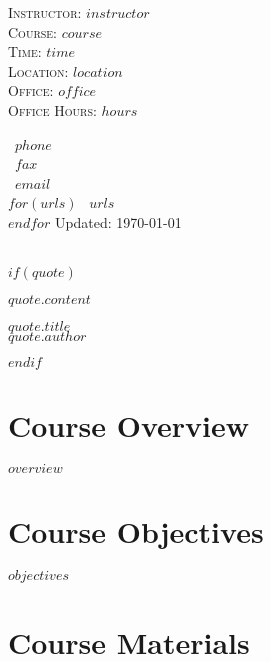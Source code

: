 \documentclass[$fontsize$, letterpaper]{article}
\begin{document}

\begin{minipage}[t]{2.95in}
 \flushleft \footnotesize \textsc{Instructor:} $instructor$\\ \textsc{Course:}
 $course$\\ \textsc{Time:} $time$\\ \textsc{Location:} $location$\\
 \textsc{Office:} $office$\\ \textsc{Office Hours:} $hours$
\end{minipage}
\hfill
\hfill
\begin{minipage}[t]{1.7in}
  \flushright \footnotesize {} ~$phone$\\ \Faxmachine ~$fax$\\  ~$email$\\ $for(urls)$  ~$urls$\\ $endfor$
  Updated: \today
\end{minipage}

\bigskip

\\

$if(quote)$
\bigskip
\epigraph{$quote.content$}{\textit{$quote.title$}\\\textsc{$quote.author$}}
\smallskip
$endif$

\section*{Course Overview}

$overview$

\section*{Course Objectives}

$objectives$

\section*{Course Materials}
\end{document}
